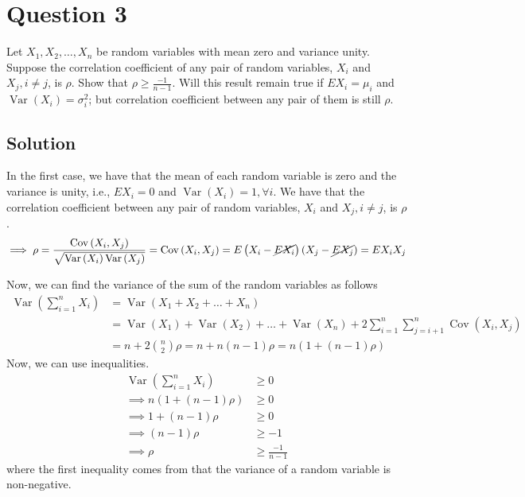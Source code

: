 \section*{Question 3}

Let \( X_{1}, X_{2}, \dots, X_{n} \) be random variables with mean zero and variance unity.
Suppose the correlation coefficient of any pair of random variables, \( X_{i} \) and \( X_{j}, i \neq j \), is \( \rho \).
Show that \( \rho \geq \frac{-1}{n-1} \).
Will this result remain true if \( E X_{i}=\mu_{i} \) and \( \operatorname{Var}\left(X_{i}\right)=\sigma_{i}^{2} \); but correlation coefficient between any pair of them is still \( \rho \).

\subsection*{Solution}

In the first case, we have that the mean of each random variable is zero and the variance is unity, i.e., \( E X_{i}=0 \) and \( \operatorname{Var}\left(X_{i}\right)=1, \forall i \).
We have that the correlation coefficient between any pair of random variables, \( X_{i} \) and \( X_{j}, i \neq j \), is \( \rho \).
\begin{equation*}
    \implies
    \rho
    =
    \frac{\operatorname{Cov}\left(X_{i}, X_{j}\right)}{\sqrt{\operatorname{Var}\left(X_{i}\right) \operatorname{Var}\left(X_{j}\right)}}
    =
    \operatorname{Cov}\left(X_{i}, X_{j}\right)
    =
    E\left(X_{i} - \cancel{E X_{i}}\right)\left(X_{j} - \cancel{E X_{j}}\right)
    =
    E X_{i} X_{j}
\end{equation*}

Now, we can find the variance of the sum of the random variables as follows
\begin{align*}
    \operatorname{Var}\left(\sum_{i=1}^{n} X_{i}\right)
     & =
    \operatorname{Var}\left(X_{1} + X_{2} + \dots + X_{n}\right)
    \\ & =
    \operatorname{Var}\left(X_{1}\right) + \operatorname{Var}\left(X_{2}\right) + \dots + \operatorname{Var}\left(X_{n}\right)
    + 2 \sum_{i=1}^{n} \sum_{j=i+1}^{n} \operatorname{Cov}\left(X_{i}, X_{j}\right)
    \\ & =
    n + 2 \binom{n}{2} \rho
    =
    n + n(n-1) \rho
    =
    n(1 + (n-1) \rho)
\end{align*}
Now, we can use inequalities.
\begin{align*}
    \operatorname{Var}\left(\sum_{i=1}^{n} X_{i}\right)
     & \geq
    0
    \\ \implies
    n(1 + (n-1) \rho)
     & \geq
    0
    \\ \implies
    1 + (n-1) \rho
     & \geq
    0
    \\ \implies
    (n-1) \rho
     & \geq
    -1
    \\ \implies
    \rho
     & \geq
    \frac{-1}{n-1}
\end{align*}
where the first inequality comes from that the variance of a random variable is non-negative.
